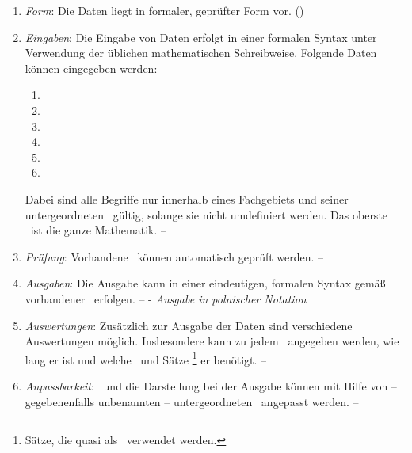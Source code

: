 %
\begin{enumerate}

	\item \label{Anforderung:Form} \emph{Form}:
	Die Daten liegt in formaler, geprüfter Form vor.
	()

	\item \label{Anforderung:Eingaben} \emph{Eingaben}:
	Die Eingabe von Daten erfolgt in einer formalen Syntax unter Verwendung der üblichen mathematischen Schreibweise.
	Folgende Daten können eingegeben werden:
	\begin{enumerate}
		\item \Axiome
		\item \Saetze
		\item \Beweise
		\item \Fachbegriffe
		\item \Fachgebiete
		\item \Ausgabeschemata
	\end{enumerate}
	Dabei sind alle Begriffe nur innerhalb eines Fachgebiets und seiner untergeordneten \Fachgebiete\ gültig, solange sie nicht umdefiniert werden.
	Das oberste \Fachgebiet\ ist die ganze Mathematik.
	-- 

	\item \label{Anforderung:Prüfung} \emph{Prüfung}:
	Vorhandene \Beweise\ können automatisch geprüft werden.
	-- 

	\item \label{Anforderung:Ausgaben} \emph{Ausgaben}:
	Die Ausgabe kann in einer eindeutigen, formalen Syntax gemäß vorhandener \Ausgabeschemata\ erfolgen.
	--  - \emph{Ausgabe in polnischer Notation}

	\item \label{Anforderung:Auswertungen} \emph{Auswertungen}:
	Zusätzlich zur Ausgabe der Daten sind verschiedene Auswertungen möglich.
	Insbesondere kann zu jedem \Beweis\ angegeben werden, wie lang er ist und welche \Axiome\ und Sätze%
	\footnote{Sätze, die quasi als \Axiome\ verwendet werden.}
	er benötigt.
	-- 

	\item \label{Anforderung:Anpassbarkeit} \emph{Anpassbarkeit}:
	\Fachbegriffe\ und die Darstellung bei der Ausgabe können mit Hilfe von -- gegebenenfalls unbenannten -- untergeordneten \Fachgebieten\ angepasst werden.
	-- 


\end{enumerate}
